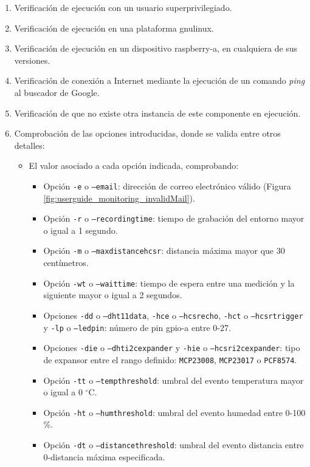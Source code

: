 \documentclass[12pt,a4paper, twoside]{report}
\begin{document}
	 \begin{enumerate}
	 	\item Verificación de ejecución con un usuario superprivilegiado.
		\item Verificación de ejecución en una plataforma \gls{gnulinux}. 
		\item Verificación de ejecución en un dispositivo \gls{raspberry-a}, en cualquiera de sus versiones.
		\item Verificación de conexión a Internet mediante la ejecución de un comando \textit{ping} al buscador de Google.		
		\item Verificación de que no existe otra instancia de este componente en ejecución.
		
		\item Comprobación de las opciones introducidas, donde se valida entre otros detalles:
		
		\begin{itemize}
			\item El valor asociado 	a cada opción indicada, comprobando:
			
				\begin{itemize}
					\item Opción \texttt{-e} o \texttt{--email}: dirección de correo electrónico válido (Figura \ref{fig:userguide_monitoring_invalidMail}).
					\item Opción \texttt{-r} o \texttt{--recordingtime}: tiempo de grabación del entorno mayor o igual a 1 segundo.
					\item Opción \texttt{-m} o \texttt{--maxdistancehcsr}: distancia máxima mayor que 30 centímetros.
					\item Opción \texttt{-wt} o \texttt{--waittime}: tiempo de espera entre una medición y la siguiente mayor o igual a 2 segundos.      
					\item Opciones \texttt{-dd} o \texttt{--dht11data}, \texttt{-hce} o \texttt{--hcsrecho}, \texttt{-hct} o \texttt{--hcsrtrigger} y \texttt{-lp} o \texttt{--ledpin}: número de pin \gls{gpio-a} entre 0-27.      
					\item Opciones \texttt{-die} o \texttt{--dhti2cexpander} y \texttt{-hie} o \texttt{--hcsri2cexpander}: tipo de expansor entre el rango definido: \texttt{MCP23008}, \texttt{MCP23017} o \texttt{PCF8574}. 
					\item Opción \texttt{-tt} o \texttt{--tempthreshold}: umbral del evento temperatura mayor o igual a 0 $^{\circ}$C.
					\item Opción \texttt{-ht} o \texttt{--humthreshold}: umbral del evento humedad entre 0-100 \%.
					\item Opción \texttt{-dt} o \texttt{--distancethreshold}: umbral del evento distancia entre 0-distancia máxima especificada.
				\end{itemize}
			

\end{itemize}
\end{enumerate}
\end{document}
